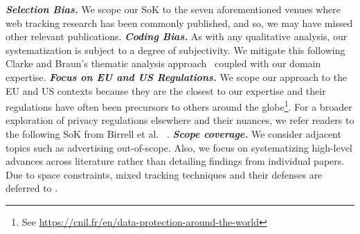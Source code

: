

%
\textbf{\textit{Selection Bias.}} We scope our SoK to the seven aforementioned venues where web tracking research has been commonly published, and so, we may have missed other relevant publications.
%
\textbf{\textit{Coding Bias.}} As with any qualitative analysis, our systematization is subject to a degree of subjectivity.
We mitigate this following Clarke and Braun's thematic analysis approach~\cite{clarke2013successful} coupled with our domain expertise.
%
%
\textbf{\textit{Focus on EU and US Regulations.}} We scope our approach to the EU and US contexts because they are the closest to our expertise and their regulations have often been precursors to others around the globe\footnote{See \url{https://cnil.fr/en/data-protection-around-the-world}}.
For a broader exploration of privacy regulations elsewhere and their nuances, we refer readers to the following SoK from Birrell et al. ~\cite{birrellSoKTechnicalImplementation2024}.
%
\textbf{\textit{Scope coverage.}} We consider adjacent topics such as advertising out-of-scope. Also, we focus on systematizing high-level advances across literature rather than detailing findings from individual papers. Due to space constraints, mixed tracking techniques and their defenses are deferred to .
